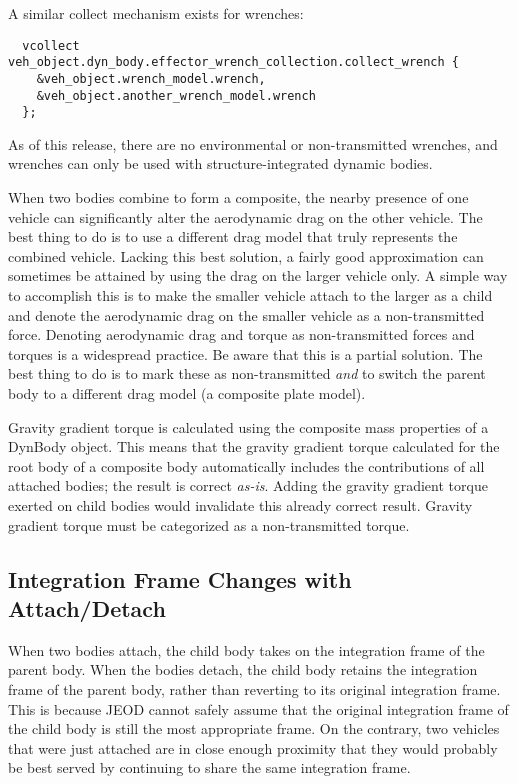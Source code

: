 A similar collect mechanism exists for wrenches:
\begin{verbatim}
  vcollect veh_object.dyn_body.effector_wrench_collection.collect_wrench {
    &veh_object.wrench_model.wrench,
    &veh_object.another_wrench_model.wrench
  };
\end{verbatim}
As of this release, there are no environmental or non-transmitted wrenches,
and wrenches can only be used with structure-integrated dynamic bodies.

When two bodies combine to form a composite, the nearby presence of one vehicle
can significantly alter the aerodynamic drag on the other vehicle. The best
thing to do is to use a different drag model that truly represents the combined
vehicle. Lacking this best solution, a fairly good approximation can sometimes
be attained by using the drag on the larger vehicle only. A simple way to
accomplish this is to make the smaller vehicle attach to the larger as a child
and denote the aerodynamic drag on the smaller vehicle as a non-transmitted
force. Denoting aerodynamic drag and torque as non-transmitted forces and
torques is a widespread practice. Be aware that this is a partial solution.
The best thing to do is to mark these as non-transmitted \emph{and} to switch the
parent body to a different drag model (\eg a composite plate model).

Gravity gradient torque is calculated using the composite mass properties of
a DynBody object. This means that the gravity gradient torque calculated for the
root body of a composite body automatically includes the contributions of all
attached bodies; the result is correct \emph{as-is}. Adding the gravity gradient
torque exerted on child bodies would invalidate this already correct result.
Gravity gradient torque must be categorized as a non-transmitted torque.

\subsection{Integration Frame Changes with Attach/Detach}
When two bodies attach, the child body takes on the integration frame of the parent body. When the bodies detach, the child body retains the integration frame of the parent body, rather than reverting to its original integration frame. This is because JEOD cannot safely assume that the original integration frame of the child body is still the most appropriate frame. On the contrary, two vehicles that were just attached are in close enough proximity that they would probably be best served by continuing to share the same integration frame.

